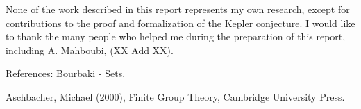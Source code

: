 \documentclass[brochure,english,12pt]{bourbaki}
\theoremstyle{plain}
\begin{document}
None of the work described in this report represents my own research, except for contributions to the
proof and formalization of the Kepler conjecture.  I would like to thank the many people who helped me
during the preparation of this report, including A. Mahboubi, (XX Add XX).



\raggedright



References: Bourbaki - Sets.

Aschbacher, Michael (2000), Finite Group Theory, Cambridge University Press.
\end{document}
